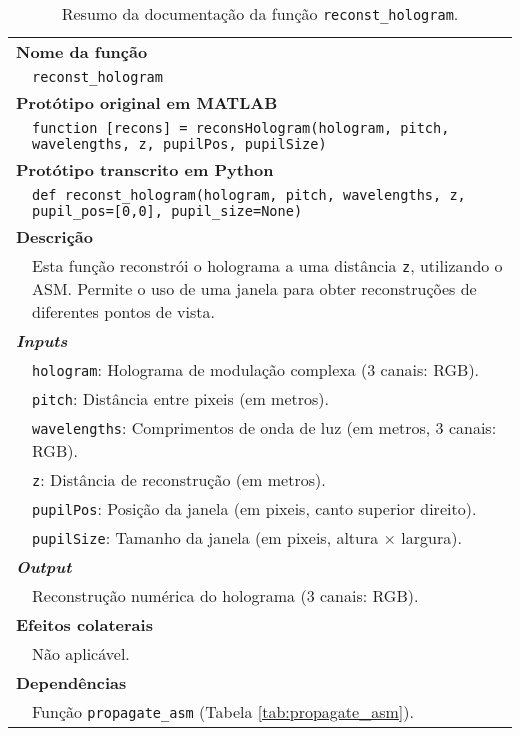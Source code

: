 \begin{table}[!hp]
    \centering
    \caption{Resumo da documentação da função \texttt{reconst\_hologram}.}
    \label{tab:reconst_hologram}
    \begin{tabular}{p{1cm} p{10cm}}
        \hline
        \multicolumn{2}{l}{\bfseries Nome da função}\\
         & \verb|reconst_hologram|\\
        \hline
        \multicolumn{2}{l}{\bfseries Protótipo original em MATLAB}\\
         & \texttt{function [recons] = reconsHologram(hologram, pitch, wavelengths, z, pupilPos, pupilSize)
         }\\
        \hline
        \multicolumn{2}{l}{\bfseries Protótipo transcrito em Python}\\
         & \texttt{def reconst_hologram(hologram, pitch, wavelengths, z, pupil_pos=[0,0], pupil_size=None)} \\
        \hline\multicolumn{2}{l}{\bfseries Descrição}\\
         & Esta função reconstrói o holograma a uma distância \verb|z|, utilizando o \ac{ASM}. Permite o uso de uma janela para obter reconstruções de diferentes pontos de vista.\\
        \hline\multicolumn{2}{l}{\bfseries \textit{Inputs}}\\
         & \verb|hologram|: Holograma de modulação complexa (3 canais: \ac{RGB}). \\
         & \verb|pitch|: Distância entre pixeis (em metros).\\
         & \verb|wavelengths|: Comprimentos de onda de luz (em metros, 3 canais: \ac{RGB}).\\
         & \verb|z|: Distância de reconstrução (em metros).\\
         & \verb|pupilPos|: Posição da janela (em pixeis, canto superior direito).\\
         & \verb|pupilSize|: Tamanho da janela (em pixeis, altura $\times$ largura).\\
        \hline\multicolumn{2}{l}{\bfseries \textit{Output}}\\
         & Reconstrução numérica do holograma (3 canais: \ac{RGB}).\\
        \hline\multicolumn{2}{l}{\bfseries Efeitos colaterais}\\
         & Não aplicável. \\
        \hline\multicolumn{2}{l}{\bfseries Dependências}\\
         & Função \verb|propagate_asm| (Tabela \ref{tab:propagate_asm}). \\
        \hline
    \end{tabular}
\end{table}


